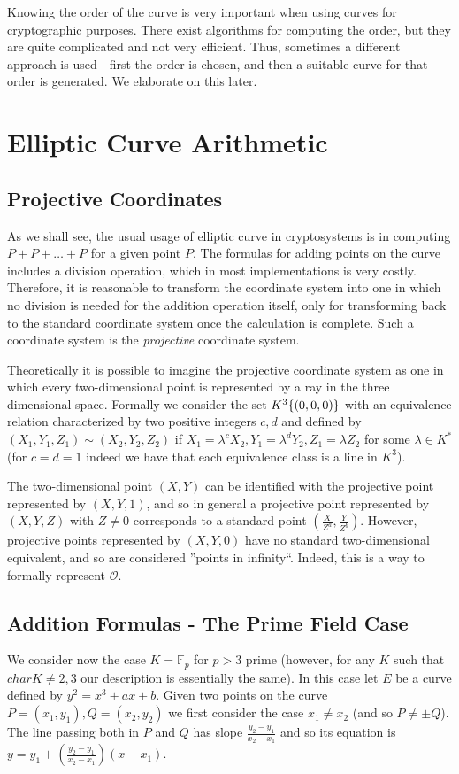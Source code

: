 \documentclass[11pt,english]{article}
\begin{document}
Knowing the order of the curve is very important when using curves for cryptographic purposes. There exist algorithms for computing the order, but
they are quite complicated and not very efficient. Thus, sometimes a different approach is used - first the order is chosen, and then a suitable curve
for that order is generated. We elaborate on this later.
\section{Elliptic Curve Arithmetic}
\subsection{Projective Coordinates}
\label{Projective Coordinates}
As we shall see, the usual usage of elliptic curve in cryptosystems is in computing $P+P+\dots+P$ for a given point $P$. 
The formulas for adding points on the curve includes a division operation, which in most implementations is very costly. Therefore, it is reasonable to
transform the coordinate system into one in which no division is needed for the addition operation itself, only for transforming back to the standard
coordinate system once the calculation is complete. Such a coordinate system is the \emph{projective} coordinate system.

Theoretically it is possible to imagine the projective coordinate system as one in which every two-dimensional point is represented by a ray in the three
dimensional space. Formally we consider the set $K^3\\\{(0,0,0)\}$ with an equivalence relation characterized by two positive integers $c,d$ and
defined by $(X_1,Y_1,Z_1)\sim (X_2,Y_2,Z_2)$ if $X_1=\lambda^cX_2,Y_1=\lambda^dY_2,Z_1=\lambda Z_2$ for some $\lambda\in K^*$ (for $c=d=1$
indeed we have that each equivalence class is a line in $K^3$).

The two-dimensional point $(X,Y)$ can be identified with the projective point represented by $(X,Y,1)$, and so in general a projective point represented by
$(X,Y,Z)$ with $Z\ne 0$ corresponds to a standard point $(\frac{X}{Z^a},\frac{Y}{Z^b})$. However, projective points represented by $(X,Y,0)$
have no standard two-dimensional equivalent, and so are considered ''points in infinity``. Indeed, this is a way to formally represent $\mathcal{O}$.

\subsection{Addition Formulas - The Prime Field Case}
We consider now the case $K=\mathbb{F}_p$ for $p>3$ prime (however, for any $K$ such that $char K\ne 2,3$ our description is essentially the same).
In this case let $E$ be a curve defined by $y^2=x^3+ax+b$. Given two points on the curve $P=(x_1,y_1),Q=(x_2,y_2)$ we first consider the case $x_1\ne x_2$
(and so $P\ne\pm Q$). The line passing both in $P$ and $Q$ has slope $\frac{y_2-y_1}{x_2-x_1}$ and so its equation is $y=y_1+\left(\frac{y_2-y_1}{x_2-x_1}\right)(x-x_1)$.
\end{document}
